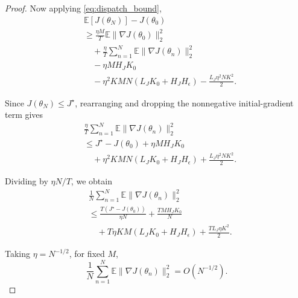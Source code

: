 \begin{proof}
Now applying \eqref{eq:dispatch_bound},
\begin{align*}
&\mathbb E[J(\theta_N)]-J(\theta_0)\\
&\ge
\frac{\eta M}{T}\mathbb E\|\nabla J(\theta_0)\|_2^2\\
&\quad+
\frac{\eta}{T}\sum_{n=1}^N
\mathbb E\|\nabla J(\theta_n)\|_2^2\\
&\quad-\eta MH_JK_0\\
&\quad-\eta^2 KMN(L_JK_0+H_JH_\epsilon)
-\frac{L_J\eta^2NK^2}{2}.
\end{align*}

Since $J(\theta_N)\le J^\star$, rearranging and
dropping the nonnegative initial-gradient term gives
\begin{align*}
&\frac{\eta}{T}\sum_{n=1}^N
\mathbb E\|\nabla J(\theta_n)\|_2^2\\
&\le J^\star-J(\theta_0)
+\eta MH_JK_0\\
&\quad+\eta^2 KMN(L_JK_0+H_JH_\epsilon)
+\frac{L_J\eta^2NK^2}{2}.
\end{align*}

Dividing by $\eta N/T$, we obtain
\begin{align}
&\frac1N\sum_{n=1}^N
\mathbb E\|\nabla J(\theta_n)\|_2^2
\nonumber\\
&\le
\frac{T(J^\star-J(\theta_0))}{\eta N}
+\frac{TMH_JK_0}{N}
\nonumber\\
&\quad+
T\eta KM(L_JK_0+H_JH_\epsilon)
+\frac{TL_J\eta K^2}{2}.
\label{eq:async_convergence_rate}
\end{align}

Taking $\eta=N^{-1/2}$, for fixed $M$,
\[
\frac1N\sum_{n=1}^N
\mathbb E\|\nabla J(\theta_n)\|_2^2
=O(N^{-1/2}).
\]
\end{proof}